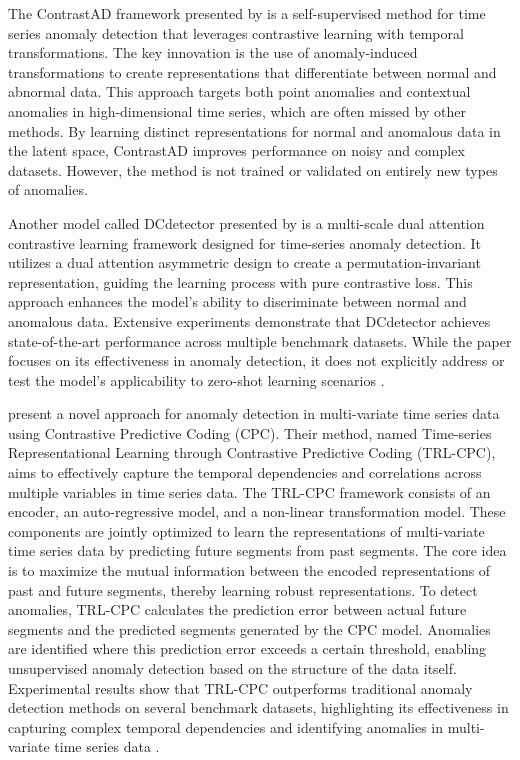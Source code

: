 The ContrastAD framework presented by \cite{li_contrastive_2023} is a self-supervised method for time series anomaly detection that leverages contrastive learning with temporal transformations. The key innovation is the use of anomaly-induced transformations to create representations that differentiate between normal and abnormal data. This approach targets both point anomalies and contextual anomalies in high-dimensional time series, which are often missed by other methods. By learning distinct representations for normal and anomalous data in the latent space, ContrastAD improves performance on noisy and complex datasets. However, the method is not trained or validated on entirely new types of anomalies.

Another model called DCdetector presented by \cite{yang_dcdetector_2023} is a multi-scale dual attention contrastive learning framework designed for time-series anomaly detection. It utilizes a dual attention asymmetric design to create a permutation-invariant representation, guiding the learning process with pure contrastive loss. This approach enhances the model's ability to discriminate between normal and anomalous data. Extensive experiments demonstrate that DCdetector achieves state-of-the-art performance across multiple benchmark datasets. While the paper focuses on its effectiveness in anomaly detection, it does not explicitly address or test the model's applicability to zero-shot learning scenarios \cite{yang_dcdetector_2023}.

%
\cite{pranavan_contrastive_2022} present a novel approach for anomaly detection in multi-variate time series data using Contrastive Predictive Coding (CPC). Their method, named Time-series Representational Learning through Contrastive Predictive Coding (TRL-CPC), aims to effectively capture the temporal dependencies and correlations across multiple variables in time series data.
The TRL-CPC framework consists of an encoder, an auto-regressive model, and a non-linear transformation model. These components are jointly optimized to learn the representations of multi-variate time series data by predicting future segments from past segments. The core idea is to maximize the mutual information between the encoded representations of past and future segments, thereby learning robust representations.
To detect anomalies, TRL-CPC calculates the prediction error between actual future segments and the predicted segments generated by the CPC model. Anomalies are identified where this prediction error exceeds a certain threshold, enabling unsupervised anomaly detection based on the structure of the data itself.
Experimental results show that TRL-CPC outperforms traditional anomaly detection methods on several benchmark datasets, highlighting its effectiveness in capturing complex temporal dependencies and identifying anomalies in multi-variate time series data \cite{pranavan_contrastive_2022}.

